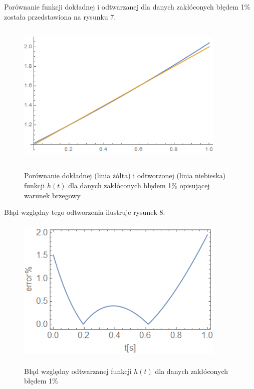 \documentclass[twoside]{projektInzynierskiMS1}
\begin{document}
Porównanie funkcji dokładnej i odtwarzanej dla danych zakłóconych błędem 1\% została przedstawiona na rysunku 7. \\

\begin{figure}[H]
\begin{center}
		\includegraphics[height=7cm, width=10cm]{pics/1reconstruction.png}\\
	\caption{Porównanie dokładnej (linia żółta) i odtworzonej (linia niebieska) funkcji $h(t)$ dla danych zakłóconych błędem 1\% opisującej warunek brzegowy}
\end{center}
\end{figure}

Błąd względny tego odtworzenia ilustruje rysunek 8. \\

\begin{figure}[H]
\begin{center}
		\includegraphics[height=7cm, width=10cm]{pics/1abs.png}\\
	\caption{Błąd względny odtwarzanej funkcji $h(t)$ dla danych zakłóconych błędem 1\%}
\end{center}
\end{figure}
\end{document}
